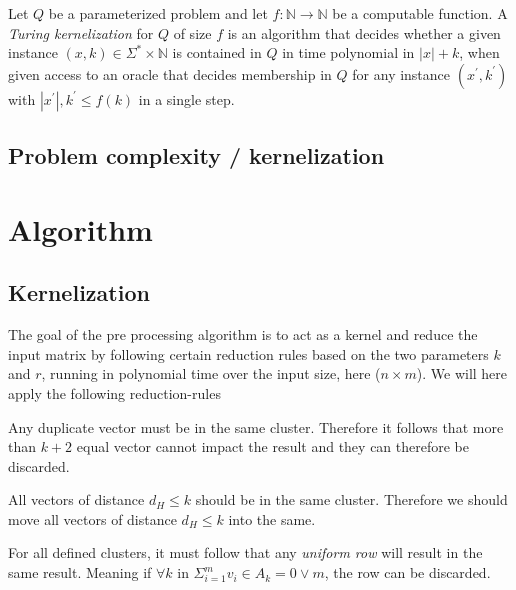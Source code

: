\documentclass[a4paper]{article}
\begin{document}
\begin{theoremdefinition}
    Let $Q$ be a parameterized problem and let $f:\mathbb{N} \rightarrow \mathbb{N} $
    be a computable function. A \textit{Turing kernelization} for $Q$ of size $f$ is an
    algorithm that decides whether a given instance $(x,k) \in \Sigma^* \times \mathbb{N}$
    is contained in $Q$ in time polynomial in $|x|+k$, when given access to an oracle
    that decides membership in $Q$ for any instance $(x^\prime, k^\prime)$ with
    $|x^\prime|,k^\prime \leq f(k)$ in a single step. \cite[p.~314]{param_algo_book}
\end{theoremdefinition}

\subsection{Problem complexity / kernelization}

%
%
\newpage

\section{Algorithm}
\subsection{Kernelization}
The goal of the pre processing algorithm is to act as a kernel and reduce the input matrix by following certain reduction rules
based on the two parameters $k$ and $r$, running in polynomial time over the input size, here ($n \times m$).
We will here apply the following reduction-rules 
\begin{reductionrule}\label{red:equalclusters}
    Any duplicate vector must be in the same cluster. Therefore it follows that more than $k+2$ equal vector
    cannot impact the result and they can therefore be discarded.
\end{reductionrule}

\begin{reductionrule}\label{red:distmaxk}
    All vectors of distance $d_H \leq k$ should be in the same cluster. Therefore we should move all vectors of
    distance $d_H \leq k$ into the same.
\end{reductionrule}

\begin{reductionrule}\label{red:uniformrow}
    For all defined clusters, it must follow that any \textit{uniform row} will result in the same result. Meaning 
    if $\forall k$ in $\Sigma_{i=1}^{m} v_i \in A_k = 0 \vee m$, the row can be discarded.
\end{reductionrule}
\end{document}
